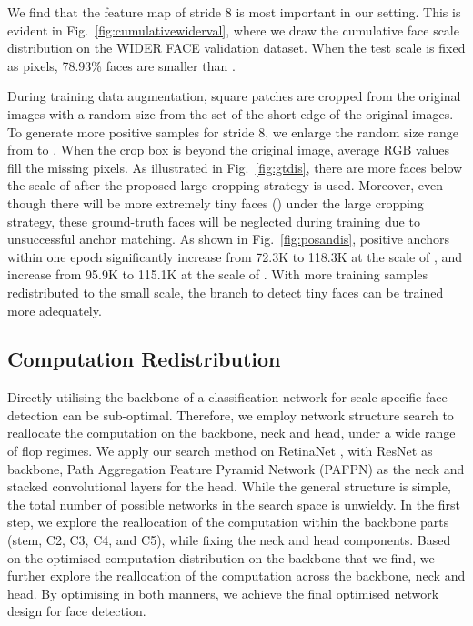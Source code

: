 \documentclass[10pt,twocolumn,letterpaper]{article}
\begin{document}
We find that the feature map of stride 8 is most important in our setting.
This is evident in Fig.~\ref{fig:cumulativewiderval}, where we draw the cumulative face scale distribution on the WIDER FACE validation dataset.
When the test scale is fixed as  pixels, 78.93\% faces are smaller than .

During training data augmentation, square patches are cropped from the original images with a random size from the set  of the short edge of the original images. To generate more positive samples for stride 8, we enlarge the random size range from  to . When the crop box is beyond the original image, average RGB values fill the missing pixels. As illustrated in Fig.~\ref{fig:gtdis}, there are more faces below the scale of  after the proposed large cropping strategy is used. Moreover, even though there will be more extremely tiny faces (\eg ) under the large cropping strategy, these ground-truth faces will be neglected during training due to unsuccessful anchor matching. As shown in Fig.~\ref{fig:posandis}, positive anchors within one epoch significantly increase from 72.3K to 118.3K at the scale of , and increase from 95.9K to 115.1K at the scale of . With more training samples redistributed to the small scale, the branch to detect tiny faces can be trained more adequately. 

\subsection{Computation Redistribution}
\label{sec:computation_redistribution}

Directly utilising the backbone of a classification network for scale-specific face detection can be sub-optimal. Therefore, we employ network structure search \cite{radosavovic2020designing} to reallocate the computation on the backbone, neck and head, under a wide range of flop regimes. We apply our search method on RetinaNet \cite{lin2017feature}, with ResNet \cite{he2016deep} as backbone, Path Aggregation Feature Pyramid Network (PAFPN) \cite{liu2018path} as the neck and stacked  convolutional layers for the head. While the general structure is simple, the total number of possible networks in the search space is unwieldy. In the first step, we explore the reallocation of the computation within the backbone parts (\ie stem, C2, C3, C4, and C5), while fixing the neck and head components. Based on the optimised computation distribution on the backbone that we find, we further explore the reallocation of the computation across the backbone, neck and head. By optimising in both manners, we achieve the final optimised network design for face detection.
\end{document}
